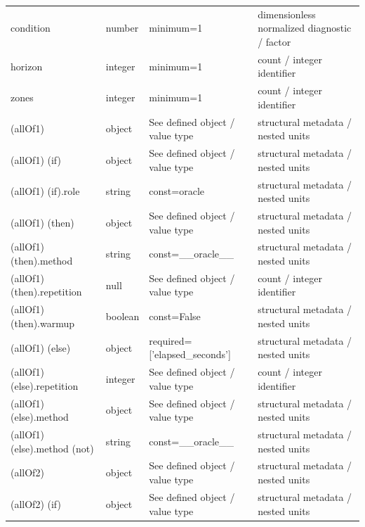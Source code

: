 \begin{longtable}{@{}>{\raggedright\arraybackslash}p{}>{\raggedright\arraybackslash}p{}>{\raggedright\arraybackslash}p{}>{\raggedright\arraybackslash}p{}@{}}
condition & number & minimum=\allowbreak{}1 & dimensionless normalized diagnostic /\allowbreak{} factor\\
horizon & integer & minimum=\allowbreak{}1 & count /\allowbreak{} integer identifier\\
zones & integer & minimum=\allowbreak{}1 & count /\allowbreak{} integer identifier\\
 (allOf1) & object & See defined object /\allowbreak{} value type & structural metadata /\allowbreak{} nested units\\
 (allOf1) (if) & object & See defined object /\allowbreak{} value type & structural metadata /\allowbreak{} nested units\\
 (allOf1) (if).\allowbreak{}role & string & const=\allowbreak{}oracle & structural metadata /\allowbreak{} nested units\\
 (allOf1) (then) & object & See defined object /\allowbreak{} value type & structural metadata /\allowbreak{} nested units\\
 (allOf1) (then).\allowbreak{}method & string & const=\allowbreak{}\_\allowbreak{}\_\allowbreak{}oracle\_\allowbreak{}\_\allowbreak{} & structural metadata /\allowbreak{} nested units\\
 (allOf1) (then).\allowbreak{}repetition & null & See defined object /\allowbreak{} value type & count /\allowbreak{} integer identifier\\
 (allOf1) (then).\allowbreak{}warmup & boolean & const=\allowbreak{}False & structural metadata /\allowbreak{} nested units\\
 (allOf1) (else) & object & required=\allowbreak{}['elapsed\_\allowbreak{}seconds'] & structural metadata /\allowbreak{} nested units\\
 (allOf1) (else).\allowbreak{}repetition & integer & See defined object /\allowbreak{} value type & count /\allowbreak{} integer identifier\\
 (allOf1) (else).\allowbreak{}method & object & See defined object /\allowbreak{} value type & structural metadata /\allowbreak{} nested units\\
 (allOf1) (else).\allowbreak{}method (not) & string & const=\allowbreak{}\_\allowbreak{}\_\allowbreak{}oracle\_\allowbreak{}\_\allowbreak{} & structural metadata /\allowbreak{} nested units\\
 (allOf2) & object & See defined object /\allowbreak{} value type & structural metadata /\allowbreak{} nested units\\
 (allOf2) (if) & object & See defined object /\allowbreak{} value type & structural metadata /\allowbreak{} nested units\\

\end{longtable}
